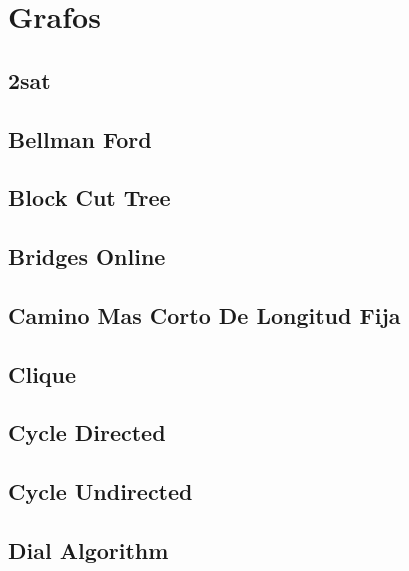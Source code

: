 \section{Grafos}
\subsection{2sat}
\raggedbottom
\hrulefill
\subsection{Bellman Ford}
\raggedbottom
\hrulefill
\subsection{Block Cut Tree}
\raggedbottom
\hrulefill
\subsection{Bridges Online}
\raggedbottom
\hrulefill
\subsection{Camino Mas Corto De Longitud Fija}
\raggedbottom
\hrulefill
\subsection{Clique}
\raggedbottom
\hrulefill
\subsection{Cycle Directed}
\raggedbottom
\hrulefill
\subsection{Cycle Undirected}
\raggedbottom
\hrulefill
\subsection{Dial Algorithm}
\raggedbottom
\hrulefill
